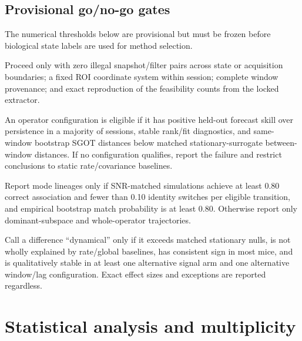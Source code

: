 \documentclass[11pt,a4paper]{article}
\begin{document}
\subsection{Provisional go/no-go gates}

The numerical thresholds below are provisional but must be frozen before biological state labels are used for method selection.

\begin{gatebox}
Proceed only with zero illegal snapshot/filter pairs across state or acquisition boundaries; a fixed ROI coordinate system within session; complete window provenance; and exact reproduction of the feasibility counts from the locked extractor.
\end{gatebox}

\begin{gatebox}
An operator configuration is eligible if it has positive held-out forecast skill over persistence in a majority of sessions, stable rank/fit diagnostics, and same-window bootstrap SGOT distances below matched stationary-surrogate between-window distances. If no configuration qualifies, report the failure and restrict conclusions to static rate/covariance baselines.
\end{gatebox}

\begin{gatebox}
Report mode lineages only if SNR-matched simulations achieve at least 0.80 correct association and fewer than 0.10 identity switches per eligible transition, and empirical bootstrap match probability is at least 0.80. Otherwise report only dominant-subspace and whole-operator trajectories.
\end{gatebox}

\begin{gatebox}
Call a difference ``dynamical'' only if it exceeds matched stationary nulls, is not wholly explained by rate/global baselines, has consistent sign in most mice, and is qualitatively stable in at least one alternative signal arm and one alternative window/lag configuration. Exact effect sizes and exceptions are reported regardless.
\end{gatebox}

\section{Statistical analysis and multiplicity}
\end{document}
